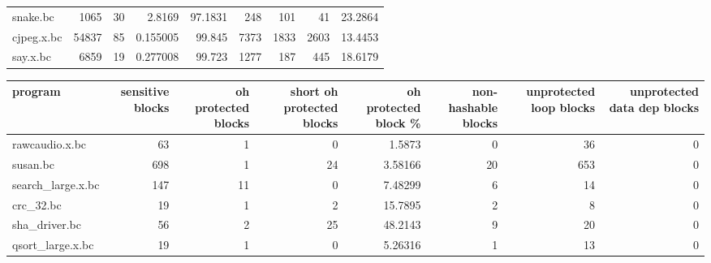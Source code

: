 \begin{tabular}{lrrrrrrrr}
 snake.bc             &          1065 &                  30 &      2.8169    &       97.1831 &                248 &                              101 &                          41 &       23.2864  \\
 cjpeg.x.bc           &         54837 &                  85 &      0.155005  &       99.845  &               7373 &                             1833 &                        2603 &       13.4453  \\
 say.x.bc             &          6859 &                  19 &      0.277008  &       99.723  &               1277 &                              187 &                         445 &       18.6179  \\
\hline
\end{tabular}\begin{tabular}{lrrrrrrr}
\hline
 program              &   sensitive blocks &   oh protected blocks &   short oh protected blocks &   oh protected block \% &   non-hashable blocks &   unprotected loop blocks &   unprotected data dep blocks \\
\hline
 rawcaudio.x.bc       &                 63 &                     1 &                           0 &               1.5873   &                     0 &                        36 &                             0 \\
 susan.bc             &                698 &                     1 &                          24 &               3.58166  &                    20 &                       653 &                             0 \\
 search\_large.x.bc    &                147 &                    11 &                           0 &               7.48299  &                     6 &                        14 &                             0 \\
 crc\_32.bc            &                 19 &                     1 &                           2 &              15.7895   &                     2 &                         8 &                             0 \\
 sha\_driver.bc        &                 56 &                     2 &                          25 &              48.2143   &                     9 &                        20 &                             0 \\
 qsort\_large.x.bc     &                 19 &                     1 &                           0 &               5.26316  &                     1 &                        13 &                             0 \\

\end{tabular}
